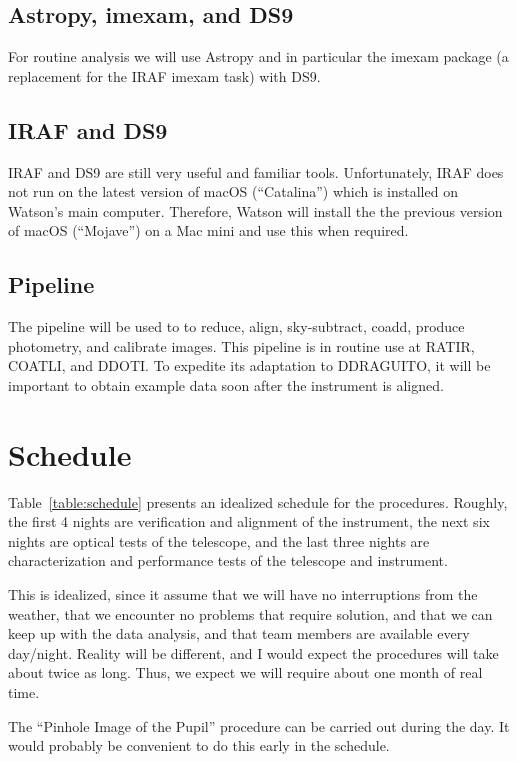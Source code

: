 \documentclass{article}
\begin{document}
\subsection{Astropy, imexam, and DS9}

For routine analysis we will use Astropy and in particular the imexam package (a replacement for the IRAF imexam task) with DS9.

\subsection{IRAF and DS9}

IRAF and DS9 are still very useful and familiar tools. Unfortunately, IRAF does not run on the latest version of macOS (“Catalina”) which is installed on Watson's main computer. Therefore, Watson will install the the previous version of macOS (“Mojave”) on a Mac mini and use this when required.

\subsection{Pipeline}

The pipeline will be used to to reduce, align, sky-subtract, coadd, produce photometry, and calibrate images. This pipeline is in routine use at RATIR, COATLI, and DDOTI. To expedite its adaptation to DDRAGUITO, it will be important to obtain example data soon after the instrument is aligned.

\section{Schedule}
\label{section:schedule}

Table~\ref{table:schedule} presents an idealized schedule for the procedures. Roughly, the first 4 nights are verification and alignment of the instrument, the next six nights are optical tests of the telescope, and the last three nights are characterization and performance tests of the telescope and instrument.

This is idealized, since it assume that we will have no interruptions from the weather, that we encounter no problems that require solution, and that we can keep up with the data analysis, and that team members are available every day/night. Reality will be different, and I would expect the procedures will take about twice as long. Thus, we expect we will require about one month of real time.

The “Pinhole Image of the Pupil” procedure can be carried out during the day. It would probably be convenient to do this early in the schedule.
\end{document}
